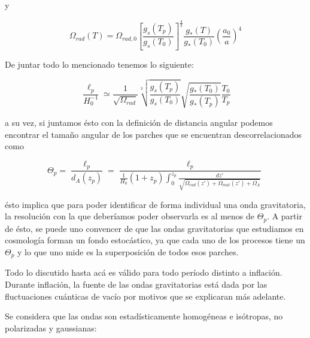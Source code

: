 \noindent
y

\begin{equation}
    \Omega_{rad} (T) = \Omega_{rad, 0} \left[ \frac{g_s (T_p)}{g_s (T_0)} \right]^{\displaystyle \frac{4}{3}} \frac{g_* (T)}{g_* (T_0)} \left( \frac{a_0}{a} \right)^4
\end{equation}

De juntar todo lo mencionado tenemos lo siguiente:

\begin{equation}
    \frac{\ell_p}{H_0^{-1}} \simeq \frac{1}{\sqrt{\Omega_{rad}}} \sqrt[3]{\frac{g_s (T_p)}{g_s (T_0)}} \sqrt{\frac{g_* (T_0)}{g_* (T_p)}} \frac{T_0}{T_p}
\end{equation}

\noindent
a su vez, si juntamos ésto con la definición de distancia angular podemos encontrar el tamaño angular de los parches que se encuentran descorrelacionados como

\begin{equation}
    \Theta_p = \frac{\ell_p}{d_A (z_p)} = \frac{\ell_p}{\displaystyle \frac{1}{H_0} (1 + z_p) \int_0^{z_p} \frac{dz'}{\sqrt{\Omega_{rad} (z') + \Omega_{mat} (z') + \Omega_\Lambda}}}
\end{equation}

\noindent
ésto implica que para poder identificar de forma individual una onda gravitatoria, la resolución con la que deberíamos poder observarla es al menos de $\Theta_p$. A partir de ésto, se puede uno convencer de que las ondas gravitatorias que estudiamos en cosmología forman un fondo estocástico, ya que cada uno de los procesos tiene un $\Theta_p$ y lo que uno mide es la superposición de todos esos parches.

Todo lo discutido hasta acá es válido para todo período distinto a inflación. Durante inflación, la fuente de las ondas gravitatorias está dada por las fluctuaciones cuánticas de vacío por motivos que se explicaran más adelante. 

Se considera que las ondas son estadísticamente homogéneas e isótropas, no polarizadas y gaussianas:

